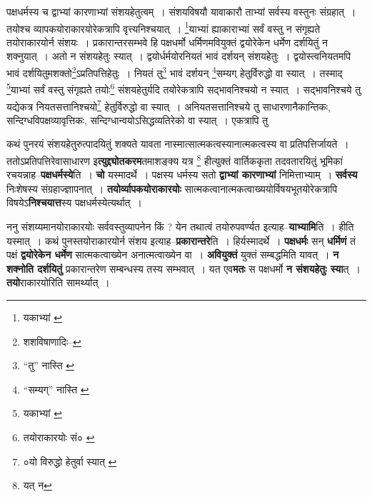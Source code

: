 \documentclass[article,12pt,a4paper]{memoir}
\begin{document}
	  \pstart पक्षधर्मस्य च द्वाभ्यां कारणाभ्यां संशयहेतुत्वम् । संशयविषयौ यावाकारौ ताभ्यां सर्वस्य वस्तुनः संग्रहात् । तयोश्च व्यापकयोराकारयोरेकत्रापि वृत्त्यनिश्चयात् । \footnote{यकाभ्यां \cite{dp-msA} \cite{dp-msB} \cite{dp-msC} \cite{dp-msD} \cite{dp-edP} \cite{dp-edH} \cite{dp-edN}}\-याभ्यां ह्याकाराभ्यां सर्वं वस्तु न संगृह्यते तयोराकारयोर्न संशयः । प्रकारान्तरसम्भवे हि पक्षधर्मो धर्मिणमवियुक्तं द्वयोरेकेन धर्मेण दर्शयितुं न शक्नुयात् । अतो न संशयहेतुः स्यात् । द्वयोर्धर्मयोरनियतं भावं दर्शयन् संशयहेतुः । द्वयोस्त्वनियतमपि भावं दर्शयितुमशक्तो\footnote{शशविषाणादिः--\cite{dp-msD-n}}\-ऽप्रतिपत्तिहेतुः । नियतं तु\footnote{“तु” नास्ति \cite{dp-msA} \cite{dp-msB} \cite{dp-edP} \cite{dp-edH} \cite{dp-edE} \cite{dp-edN}} भावं दर्शयन् \footnote{“सम्यग्” नास्ति \cite{dp-msA} \cite{dp-msB} \cite{dp-edP} \cite{dp-edH} \cite{dp-edE} \cite{dp-edN}}\-सम्यग् हेतुर्विरुद्धो वा स्यात् । तस्माद् \footnote{यकाभ्यां \cite{dp-msB} \cite{dp-msC} \cite{dp-msD} \cite{dp-edP} \cite{dp-edH} \cite{dp-edN}}\-याभ्यां सर्वं वस्तु संगृह्यते तयोः\footnote{तयोराकारयोः सं० \cite{dp-msC}} संशयहेतुर्यदि तयोरेकत्रापि सद्भावनिश्चयो न स्यात् । सद्भावनिश्चये तु यद्येकत्र नियतसत्तानिश्चयो\footnote{०यो विरुद्धो हेतुर्वा स्यात् \cite{dp-msA} \cite{dp-msB} \cite{dp-msD} \cite{dp-edP} \cite{dp-edH} \cite{dp-edE} \cite{dp-edN}} हेतुर्विरुद्धो वा स्यात् । अनियतसत्तानिश्चये तु साधारणानैकान्तिकः, सन्दिग्धविपक्षव्यावृत्तिकः, सन्दिग्धान्वयोऽसिद्धव्यतिरेको वा स्यात् । एकत्रापि तु
	\pend
      
	  \endgroup
	

	  \pstart कथं पुनरयं संशयहेतुरुत्पादयितुं शक्यते यावता नास्मात्सात्मकत्वस्यानात्मकत्वस्य वा प्रतिपत्तिर्जायते । ततोऽप्रतिपत्तिरेवासाधारण इ\textbf{त्युद्द्योतकरम}तमाशङ्क्य यत्र \footnote{यत् न} हीत्युक्तं वार्तिककृता तदवतारयितुं भूमिकां रचयन्नाह--\textbf{पक्षधर्मस्ये}ति । \textbf{चो} यस्मादर्थे । पक्षस्य धर्मस्य सतो \textbf{द्वाभ्यां कारणाभ्यां} निमित्ताभ्याम् । \textbf{सर्वस्य} निःशेषस्य संग्रहाज्ज्ञापनात् । \textbf{तयोर्व्यापकयोराकारयोः} सात्मकत्वानात्मकत्वाख्ययोर्विषयभूतयोरेकत्रापि विषयेऽ\textbf{निश्चयात्त}स्य पक्षधर्मस्येत्यर्थात् ।
	\pend
      

	  \pstart ननु संशय्यमानयोराकारयोः सर्ववस्तुव्यापनेन किं ? येन तथात्वं तयोरुपवर्ण्यत इत्याह--\textbf{याभ्यामि}ति । हीति यस्मात् । कथं पुनस्तयोराकारयोर्न संशय इत्याह--\textbf{प्रकारान्तरे}ति । हिर्यस्मादर्थे । \textbf{पक्षधर्मः} सन् \textbf{धर्मिणं} तं पक्षं \textbf{द्वयोरेकेन धर्मेण} सात्मकत्वाख्येन अनात्मत्वाख्येन वा । \textbf{अवियुक्तं} युक्तं सम्बद्धमिति यावत् । \textbf{न शक्नोति दर्शयितुं} प्रकारान्तरेण सम्बन्धस्य तस्य सम्भवात् । यत एव\textbf{मतः} स पक्षधर्मो \textbf{न संशयहेतुः स्या}त् । \textbf{तयो}राकारयोरिति सामर्थ्यात् ।
	\pend
      
\end{document}
